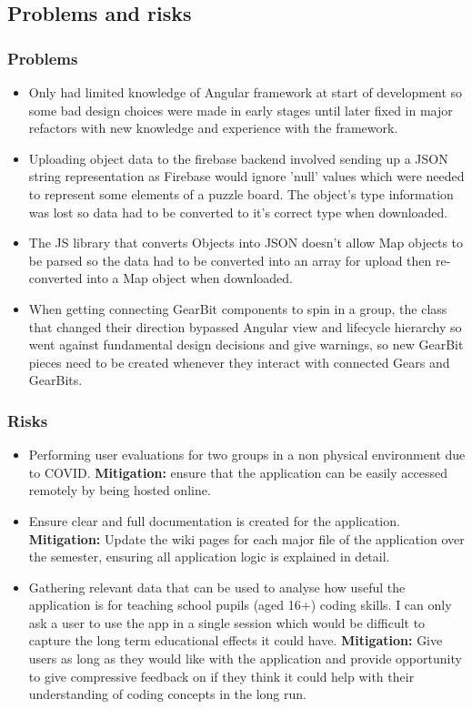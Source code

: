 \documentclass[11pt]{article}
\begin{document}
\subsection{Problems and risks}\label{problems-and-risks}


\subsubsection{Problems}\label{problems}

\begin{itemize}
    \item Only had limited knowledge of Angular framework at start of development so some bad design choices were made in early stages until later fixed in major refactors with new knowledge and experience with the framework.
    \item Uploading object data to the firebase backend involved sending up a JSON string representation as Firebase would ignore 'null' values which were needed to represent some elements of a puzzle board. The object's type information was lost so data had to be converted to it's correct type when downloaded.
    \item The JS library that converts Objects into JSON doesn't allow Map objects to be parsed so the data had to be converted into an array for upload then re-converted into a Map object when downloaded.
    \item When getting connecting GearBit components to spin in a group, the class that changed their direction bypassed Angular view and lifecycle hierarchy so went against fundamental design decisions and give warnings, so new GearBit pieces need to be created whenever they interact with connected Gears and GearBits.
\end{itemize}

\subsubsection{Risks}\label{risks}

\begin{itemize}
    \item Performing user evaluations for two groups in a non physical environment due to COVID. \textbf{Mitigation:} ensure that the application can be easily accessed remotely by being hosted online.
    \item Ensure clear and full documentation is created for the application. \textbf{Mitigation:} Update the wiki pages for each major file of the application over the semester, ensuring all application logic is explained in detail.
    \item Gathering relevant data that can be used to analyse how useful the application is for teaching school pupils (aged 16+) coding skills. I can only ask a user to use the app in a single session which would be difficult to capture the long term educational effects it could have. \textbf{Mitigation:} Give users as long as they would like with the application and provide opportunity to give compressive feedback on if they think it could help with their understanding of coding concepts in the long run.
\end{itemize}
\end{document}
